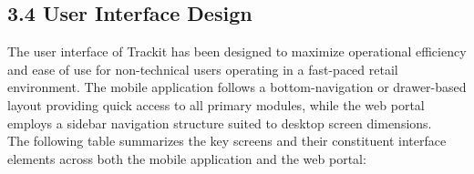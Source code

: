 \documentclass[12pt, oneside]{article}
\begin{document}
\subsection*{3.4 User Interface Design}

The user interface of Trackit has been designed to maximize operational efficiency and ease of use for non-technical users operating in a fast-paced retail environment. The mobile application follows a bottom-navigation or drawer-based layout providing quick access to all primary modules, while the web portal employs a sidebar navigation structure suited to desktop screen dimensions.\\[0.25cm]
The following table summarizes the key screens and their constituent interface elements across both the mobile application and the web portal:
\end{document}
